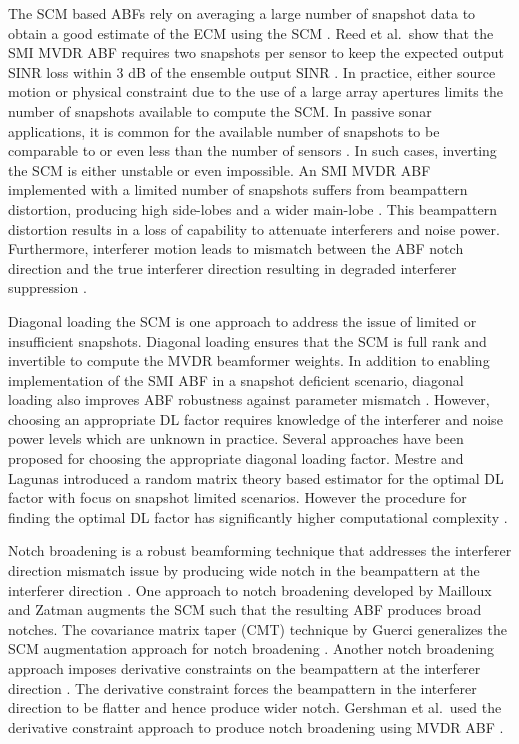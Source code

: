 The SCM based ABFs rely on averaging a large number of snapshot data
to obtain a good estimate of the ECM using the SCM \cite{vtree2002oap,
  reed1974rapid}. Reed et al.\ show that the SMI MVDR ABF requires two
snapshots per sensor to keep the expected output SINR loss within $3$
dB of the ensemble output SINR \cite{reed1974rapid}. In practice,
either source motion or physical constraint due to the use of a large
array apertures limits the number of snapshots available to compute
the SCM. In passive sonar applications, it is common for the available
number of snapshots to be comparable to or even less than the number
of sensors \cite{baggeroer1999passive}. In such cases, inverting the
SCM is either unstable or even impossible. An SMI MVDR ABF implemented
with a limited number of snapshots suffers from beampattern
distortion, producing high side-lobes and a wider main-lobe
\cite{richmond96pdfarray,Carlson1988scm}. This beampattern distortion
results in a loss of capability to attenuate interferers and noise
power. Furthermore, interferer motion leads to mismatch between the
ABF notch direction and the true interferer direction resulting in
degraded interferer suppression \cite{baggeroer1999passive,
  cox2002adaptive, riba1997comm}.

Diagonal loading the SCM is one approach to address the issue of
limited or insufficient snapshots. Diagonal loading ensures that the
SCM is full rank and invertible to compute the MVDR beamformer
weights. In addition to enabling implementation of the SMI ABF in a
snapshot deficient scenario, diagonal loading also improves ABF
robustness against parameter mismatch \cite{vtree2002oap,
  mestre2005diagonal}. However, choosing an appropriate DL factor
requires knowledge of the interferer and noise power levels which are
unknown in practice. Several approaches have been proposed for
choosing the appropriate diagonal loading factor. Mestre and Lagunas
introduced a random matrix theory based estimator for the optimal DL
factor with focus on snapshot limited scenarios. However the procedure for finding the optimal DL factor has significantly higher computational complexity 
\cite{mestre2006finite}.

Notch broadening is a robust beamforming technique that addresses the
interferer direction mismatch issue by producing wide notch in the
beampattern at the interferer direction
\cite[Sec.~6.7.6]{vtree2002oap}. One approach to notch broadening
developed by Mailloux \cite{mailloux1995null} and Zatman
\cite{zatman1995null} augments the SCM such that the resulting ABF
produces broad notches. The covariance matrix taper (CMT) technique by
Guerci generalizes the SCM augmentation approach for notch broadening
\cite{guerci1999cmt}. Another notch broadening approach imposes
derivative constraints on the beampattern at the interferer direction
\cite[Sec.~6.7.1.4]{vtree2002oap}. The derivative constraint forces
the beampattern in the interferer direction to be flatter and hence
produce wider notch. Gershman et al.\ used the derivative constraint
approach to produce notch broadening using MVDR ABF
\cite{gershman1991synthesis}.

